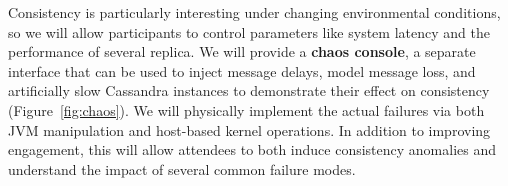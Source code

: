 Consistency is particularly interesting under changing environmental
conditions, so we will allow participants to control parameters like
system latency and the performance of several replica. We will provide
a \textbf{chaos console}, a separate interface that can be used to
inject message delays, model message loss, and artificially
slow Cassandra instances to demonstrate their effect on consistency
(Figure~\ref{fig:chaos}). We will physically implement the actual failures via
both JVM manipulation and host-based kernel operations. In addition to
improving engagement, this will allow attendees to both induce
consistency anomalies and understand the impact of several common
failure modes.
